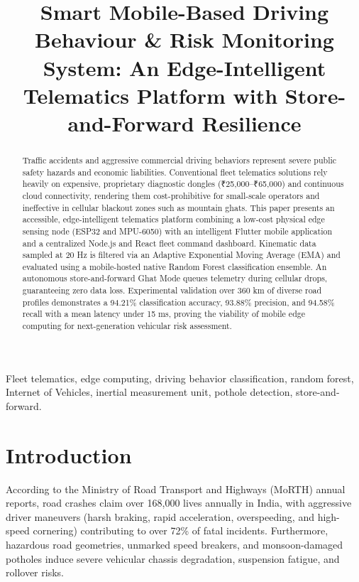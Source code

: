 \documentclass[conference]{IEEEtran}
\begin{document}
\title{Smart Mobile-Based Driving Behaviour \& Risk Monitoring System: An Edge-Intelligent Telematics Platform with Store-and-Forward Resilience}

\author{
}

\maketitle

\begin{abstract}
Traffic accidents and aggressive commercial driving behaviors represent severe public safety hazards and economic liabilities. Conventional fleet telematics solutions rely heavily on expensive, proprietary diagnostic dongles (₹25,000--₹65,000) and continuous cloud connectivity, rendering them cost-prohibitive for small-scale operators and ineffective in cellular blackout zones such as mountain ghats. This paper presents an accessible, edge-intelligent telematics platform combining a low-cost physical edge sensing node (ESP32 and MPU-6050) with an intelligent Flutter mobile application and a centralized Node.js and React fleet command dashboard. Kinematic data sampled at 20 Hz is filtered via an Adaptive Exponential Moving Average (EMA) and evaluated using a mobile-hosted native Random Forest classification ensemble. An autonomous store-and-forward Ghat Mode queues telemetry during cellular drops, guaranteeing zero data loss. Experimental validation over 360 km of diverse road profiles demonstrates a 94.21\% classification accuracy, 93.88\% precision, and 94.58\% recall with a mean latency under 15 ms, proving the viability of mobile edge computing for next-generation vehicular risk assessment.
\end{abstract}

\begin{IEEEkeywords}
Fleet telematics, edge computing, driving behavior classification, random forest, Internet of Vehicles, inertial measurement unit, pothole detection, store-and-forward.
\end{IEEEkeywords}

\section{Introduction}
According to the Ministry of Road Transport and Highways (MoRTH) annual reports, road crashes claim over 168,000 lives annually in India, with aggressive driver maneuvers (harsh braking, rapid acceleration, overspeeding, and high-speed cornering) contributing to over 72\% of fatal incidents. Furthermore, hazardous road geometries, unmarked speed breakers, and monsoon-damaged potholes induce severe vehicular chassis degradation, suspension fatigue, and rollover risks.
\end{document}

